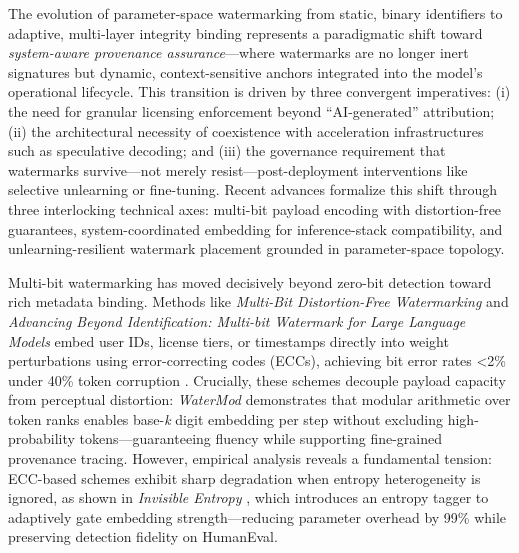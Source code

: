 \documentclass[11pt,a4paper]{article}
\begin{document}
The evolution of parameter-space watermarking from static, binary identifiers to adaptive, multi-layer integrity binding represents a paradigmatic shift toward \emph{system-aware provenance assurance}---where watermarks are no longer inert signatures but dynamic, context-sensitive anchors integrated into the model's operational lifecycle. This transition is driven by three convergent imperatives: (i) the need for granular licensing enforcement beyond ``AI-generated'' attribution; (ii) the architectural necessity of coexistence with acceleration infrastructures such as speculative decoding; and (iii) the governance requirement that watermarks survive---not merely resist---post-deployment interventions like selective unlearning or fine-tuning. Recent advances formalize this shift through three interlocking technical axes: multi-bit payload encoding with distortion-free guarantees, system-coordinated embedding for inference-stack compatibility, and unlearning-resilient watermark placement grounded in parameter-space topology.

Multi-bit watermarking has moved decisively beyond zero-bit detection toward rich metadata binding. Methods like \emph{Multi-Bit Distortion-Free Watermarking} \cite{arxiv:2402.16578} and \emph{Advancing Beyond Identification: Multi-bit Watermark for Large Language Models} \cite{doi:10.18653/v1/2024.naacl-long.224} embed user IDs, license tiers, or timestamps directly into weight perturbations using error-correcting codes (ECCs), achieving bit error rates <2\% under 40\% token corruption \cite{arxiv:2401.16820}. Crucially, these schemes decouple payload capacity from perceptual distortion: \emph{WaterMod} \cite{arxiv:2511.07863} demonstrates that modular arithmetic over token ranks enables base-\emph{k} digit embedding per step without excluding high-probability tokens---guaranteeing fluency while supporting fine-grained provenance tracing. However, empirical analysis reveals a fundamental tension: ECC-based schemes exhibit sharp degradation when entropy heterogeneity is ignored, as shown in \emph{Invisible Entropy} \cite{arxiv:2505.14112}, which introduces an entropy tagger to adaptively gate embedding strength---reducing parameter overhead by 99\% while preserving detection fidelity on HumanEval.
\end{document}
